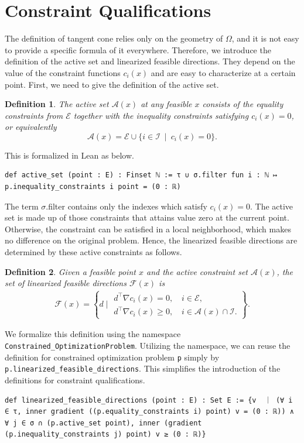 \documentclass[sn-mathphys]{JORSC-jnl}%
\theoremstyle{thmstyleone}%
\theoremstyle{thmstylethree}%
\newtheorem{definition}{Definition}%
\newcommand{\lean}[1]{\lstinline[language=lean, mathescape=true]{#1}}
\begin{document}
\section{Constraint Qualifications}\label{sec: CQ}
The definition of tangent cone relies only on the geometry of $\Omega$, and it is not easy to provide a specific formula of it everywhere. Therefore, we introduce the definition of the active set and linearized feasible directions. They depend on the value of the constraint functions $c_i(x)$ and are easy to characterize at a certain point. First, we need to give the definition of the active set.
\begin{definition}
The active set $\mathcal{A}(x)$ at any feasible $x$ consists of the equality constraints from $\mathcal{E}$ together with the inequality constraints satisfying $c_i (x) = 0$, or equivalently
\[
\mathcal{A}(x) = \mathcal{E} \cup \{i\in\mathcal{I}\ \mid\ c_i(x) = 0\} .
\]
\end{definition}
This is formalized in Lean as below.
\begin{lstlisting}
def active_set (point : E) : Finset ℕ := τ ∪ σ.filter fun i : ℕ ↦ p.inequality_constraints i point = (0 : ℝ)
\end{lstlisting}
The term $\sigma$.filter contains only the indexes which satisfy $c_i(x) = 0$.
The active set is made up of those constraints that attains value zero at the current point. Otherwise, the constraint can be satisfied in a local neighborhood, which makes no difference on the original problem. Hence, the linearized feasible directions are determined by these active constraints as follows.
\begin{definition}
    Given a feasible point $x$ and the active constraint set $\mathcal{A}(x)$, the set of linearized feasible directions $\mathcal{F}(x)$ is
\begin{align}
\mathcal{F}(x) = 
\left\{d \mid
\begin{array}{l}
d^\top \nabla c_i(x) = 0, \quad i \in \mathcal{E}, \\
d^\top \nabla c_i(x) \geqslant 0, \quad i \in \mathcal{A}(x) \cap \mathcal{I}.
\end{array}\right\}.
\label{linearized feasible}
\end{align}
\end{definition}

We formalize this definition using the namespace \lean{Constrained_OptimizationProblem}. Utilizing the namespace, we can reuse the definition for constrained optimization problem \lean{p} simply by \lean{p.linearized_feasible_directions}. This simplifies the introduction of the definitions for constraint qualifications. 
\begin{lstlisting}
def linearized_feasible_directions (point : E) : Set E := {v  ｜ (∀ i ∈ τ, inner gradient ((p.equality_constraints i) point) v = (0 : ℝ)) ∧ ∀ j ∈ σ ∩ (p.active_set point), inner (gradient (p.inequality_constraints j) point) v ≥ (0 : ℝ)}
\end{lstlisting}
\end{document}
